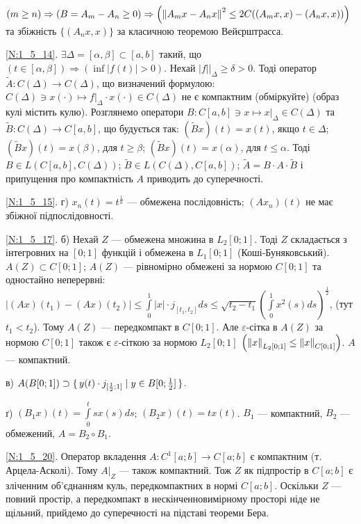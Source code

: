 $(m \geq n) \Rightarrow (B = A_m - A_n \geq 0) \Rightarrow \left(\left\lVert A_m x - A_n x\right\rVert^2 \leq 2C((A_m x, x) - (A_n x, x))\right)$ та
збіжність $\{(A_n x, x)\}$ за класичною теоремою Вейєрштрасса. 

\noindent\ref{N:1_5_14}. $\exists \Delta = [\alpha,\beta] \subset [a,b]$ такий, що
$(t \in [\alpha,\beta]) \Rightarrow (\inf|f(t)| > 0)$. Нехай $|f| \Big|_\Delta
\geq \delta > 0$. Тоді оператор $\tilde{A}: C(\Delta) \to C(\Delta)$, що визначений
формулою: $C(\Delta) \ni x(\cdot) \mapsto f \Big|_\Delta \cdot x(\cdot) \in C(\Delta)$
не є компактним (обміркуйте) (образ кулі містить кулю). Розглянемо оператори 
$B: C[a,b] \ni x \mapsto x \Big|_\Delta \in C(\Delta)$ та $\tilde{B}: C(\Delta) \to C[a,b]$,
що будується так: $(\tilde{B}x)(t) = x(t)$, якщо $t\in \Delta$; $(\tilde{B}x)(t) = x(\beta)$,
для $t\geq \beta$; $(\tilde{B}x)(t) = x(\alpha)$, для $t\leq \alpha$. Тоді
$B \in L(C[a,b], C(\Delta))$; $\tilde{B} \in L(C(\Delta), C[a,b])$; $\tilde{A} = B \cdot A
\cdot \tilde{B}$ і припущення про компактність $A$ приводить до суперечності.

\noindent\ref{N:1_5_15}. г) $x_n(t) = t^{\frac{1}{n}}$ --- обмежена послідовність;
$(Ax_n)(t)$ не має збіжної підпослідовності.

\noindent\ref{N:1_5_17}. б) Нехай $Z$ --- обмежена множина в $L_2[0;1]$. Тоді $Z$
складається з інтегровних на $[0;1]$ функцій і обмежена в $L_1[0;1]$ (Коші-Буняковський).
$A(Z) \subset C[0;1]$; $A(Z)$ --- рівномірно обмежені за нормою $C[0;1]$ та одностайно
неперервні: $\left|(Ax)(t_1) - (Ax)(t_2)\right| \leq \int\limits^1_0 |x| \cdot j_{[t_1,t_2]} ds \leq
\sqrt{t_2 - t_1} \left(\int\limits^1_0 x^2(s) ds\right)^{\frac{1}{2}}$, (тут $t_1 < t_2$).
Тому $A(Z)$ --- передкомпакт в $C[0;1]$. Але $\varepsilon$-сітка в $A(Z)$ за нормою $C[0;1]$ 
також є $\varepsilon$-сіткою за нормою $L_2[0;1]$ $\left(\left\lVert x\right\rVert_{L_2[0;1]} \leq 
\left\lVert x\right\rVert_{C[0;1]} \right)$. $A$ --- компактний.

\noindent в) $A(B[0;1]) \supset \set{y(t) \cdot j_{[\frac{1}{2};1]} \mid y \in B[0; \frac{1}{2}]}$.

\noindent ґ) $(B_1 x)(t) = \int\limits^t_0 s x(s) ds$; $(B_2 x)(t) = t x(t)$.
$B_1$ --- компактний, $B_2$ --- обмежений, $A = B_2 \circ B_1$.

\noindent\ref{N:1_5_20}. Оператор вкладення $A: C^1[a; b] \rightarrow C[a; b]$ є компактним (т. Арцела-Асколі). Тому
$A\Big|_{Z}$ --- також компактний. Тож $Z$ як підпростір в $C[a; b]$ є зліченним об'єднанням куль, передкомпактних в нормі
$C[a; b]$. Оскільки $Z$ --- повний простір, а передкомпакт в нескінченновимірному просторі ніде не щільний, прийдемо до суперечності
на підставі теореми Бера.

